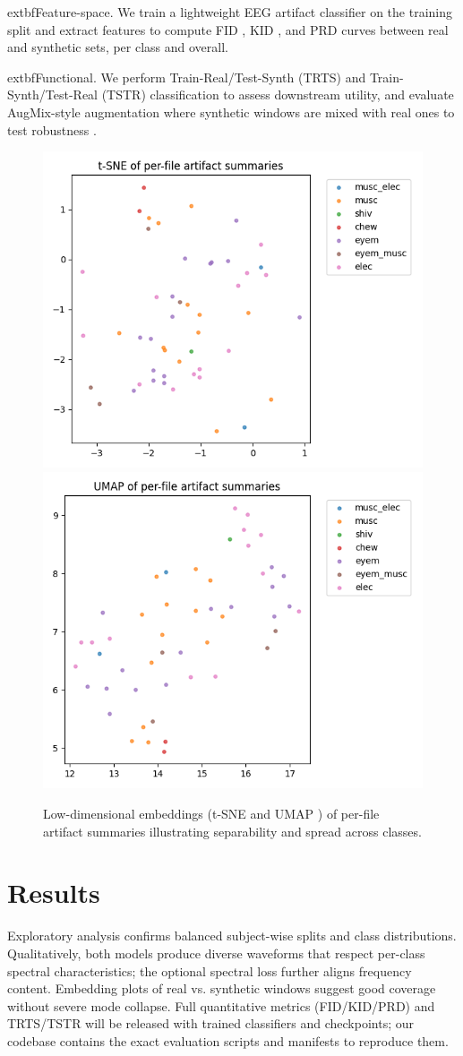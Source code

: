 \documentclass{article}
\begin{document}
	extbf{Feature-space.} We train a lightweight EEG artifact classifier on the training split and extract features to compute FID \citep{heusel2017gans}, KID \citep{binkowski2018demystifying}, and PRD curves \citep{sajjadi2018assessing} between real and synthetic sets, per class and overall.

	extbf{Functional.} We perform Train-Real/Test-Synth (TRTS) and Train-Synth/Test-Real (TSTR) classification to assess downstream utility, and evaluate AugMix-style augmentation where synthetic windows are mixed with real ones to test robustness \citep{hendrycks2020augmix}.

\begin{figure}[t]
    \centering
    \includegraphics[width=.48\linewidth]{figs/tsne_perfile_summaries.png}\hfill
    \includegraphics[width=.48\linewidth]{figs/umap_perfile_summaries.png}
    \caption{Low-dimensional embeddings (t-SNE \citep{maaten2008visualizing} and UMAP \citep{mcinnes2018umap}) of per-file artifact summaries illustrating separability and spread across classes.}
\end{figure}


\section{Results}
Exploratory analysis confirms balanced subject-wise splits and class distributions. Qualitatively, both models produce diverse waveforms that respect per-class spectral characteristics; the optional spectral loss further aligns frequency content. Embedding plots of real vs. synthetic windows suggest good coverage without severe mode collapse. Full quantitative metrics (FID/KID/PRD) and TRTS/TSTR will be released with trained classifiers and checkpoints; our codebase contains the exact evaluation scripts and manifests to reproduce them.
\end{document}
